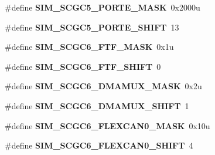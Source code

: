 \begin{DoxyCompactItemize}
\item 
\#define {\bfseries S\+I\+M\+\_\+\+S\+C\+G\+C5\+\_\+\+P\+O\+R\+T\+E\+\_\+\+M\+A\+SK}~0x2000u\hypertarget{group__SIM__Register__Masks_ga3d5e3e51d345fe424a4f24aa9ae73dc1}{}\label{group__SIM__Register__Masks_ga3d5e3e51d345fe424a4f24aa9ae73dc1}

\item 
\#define {\bfseries S\+I\+M\+\_\+\+S\+C\+G\+C5\+\_\+\+P\+O\+R\+T\+E\+\_\+\+S\+H\+I\+FT}~13\hypertarget{group__SIM__Register__Masks_gae717813cf38c35e5e4ea4243e939b4bc}{}\label{group__SIM__Register__Masks_gae717813cf38c35e5e4ea4243e939b4bc}

\item 
\#define {\bfseries S\+I\+M\+\_\+\+S\+C\+G\+C6\+\_\+\+F\+T\+F\+\_\+\+M\+A\+SK}~0x1u\hypertarget{group__SIM__Register__Masks_ga949452096cb8609fdb3503dda3f9f729}{}\label{group__SIM__Register__Masks_ga949452096cb8609fdb3503dda3f9f729}

\item 
\#define {\bfseries S\+I\+M\+\_\+\+S\+C\+G\+C6\+\_\+\+F\+T\+F\+\_\+\+S\+H\+I\+FT}~0\hypertarget{group__SIM__Register__Masks_gaf767cc087ed5983b84e79996586efb12}{}\label{group__SIM__Register__Masks_gaf767cc087ed5983b84e79996586efb12}

\item 
\#define {\bfseries S\+I\+M\+\_\+\+S\+C\+G\+C6\+\_\+\+D\+M\+A\+M\+U\+X\+\_\+\+M\+A\+SK}~0x2u\hypertarget{group__SIM__Register__Masks_ga10469a89e2c48cd79e29fb73b0d06395}{}\label{group__SIM__Register__Masks_ga10469a89e2c48cd79e29fb73b0d06395}

\item 
\#define {\bfseries S\+I\+M\+\_\+\+S\+C\+G\+C6\+\_\+\+D\+M\+A\+M\+U\+X\+\_\+\+S\+H\+I\+FT}~1\hypertarget{group__SIM__Register__Masks_gaa69ac431213fb94ecd1d9ed2fa966e50}{}\label{group__SIM__Register__Masks_gaa69ac431213fb94ecd1d9ed2fa966e50}

\item 
\#define {\bfseries S\+I\+M\+\_\+\+S\+C\+G\+C6\+\_\+\+F\+L\+E\+X\+C\+A\+N0\+\_\+\+M\+A\+SK}~0x10u\hypertarget{group__SIM__Register__Masks_ga62d67e6ac8f6b99c2d456be532b31a52}{}\label{group__SIM__Register__Masks_ga62d67e6ac8f6b99c2d456be532b31a52}

\item 
\#define {\bfseries S\+I\+M\+\_\+\+S\+C\+G\+C6\+\_\+\+F\+L\+E\+X\+C\+A\+N0\+\_\+\+S\+H\+I\+FT}~4\hypertarget{group__SIM__Register__Masks_gade95a67c98499139b322e706b4ce3db1}{}\label{group__SIM__Register__Masks_gade95a67c98499139b322e706b4ce3db1}


\end{DoxyCompactItemize}
